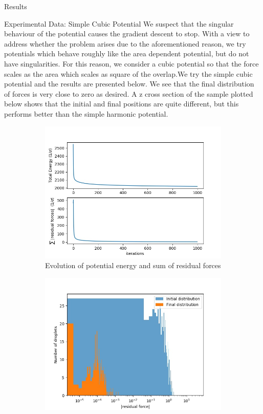 \documentclass[12pt]{article}
\begin{document}
\begin{section}{Results}
\begin{subsection}{Experimental Data: Simple Cubic Potential}
We suspect that the singular behaviour of the potential causes the gradient descent to stop. With a view to address whether the problem arises due to the aforementioned reason, we try potentials which behave roughly like the area dependent potential, but do not have singularities. For this reason, we consider a cubic potential so that the force scales as the area which scales as square of the overlap.We try the simple cubic potential and the results are presented below. We see that the final distribution of forces is very close to zero as desired. A z cross section of the sample plotted below shows that the initial and final positions are quite different, but this performs better than the simple harmonic potential.
\begin{figure}[h!]
    \begin{subfigure}{0.5\textwidth}
        \includegraphics[width=\linewidth]{images/emulsion_cubic_UandF.jpeg}
        \caption{Evolution of potential energy and sum of residual forces}
        \label{fig:sub1}
    \end{subfigure}
    \begin{subfigure}{0.5\textwidth}
        \includegraphics[width=\linewidth]{images/emulsion_cubic_residual_histogram.jpg}

\end{subfigure}
\end{figure}
\end{subsection}
\end{section}
\end{document}

